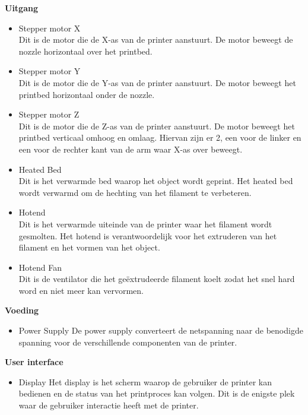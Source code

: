 \documentclass{article}
\begin{document}
\textbf{Uitgang}
\begin{itemize}
  \item Stepper motor X\\
  Dit is de motor die de X-as van de printer aanstuurt. De motor beweegt de nozzle horizontaal over het printbed.
  \item Stepper motor Y\\
  Dit is de motor die de Y-as van de printer aanstuurt. De motor beweegt het printbed horizontaal onder de nozzle.
  \item Stepper motor Z\\
  Dit is de motor die de Z-as van de printer aanstuurt. De motor beweegt het printbed verticaal omhoog en omlaag. Hiervan zijn er 2, een voor de linker en een voor de rechter kant van de arm waar X-as over beweegt.
  \item Heated Bed\\
  Dit is het verwarmde bed waarop het object wordt geprint. Het heated bed wordt verwarmd om de hechting van het filament te verbeteren.
  \item Hotend\\
  Dit is het verwarmde uiteinde van de printer waar het filament wordt gesmolten. Het hotend is verantwoordelijk voor het extruderen van het filament en het vormen van het object.
  \item Hotend Fan\\
  Dit is de ventilator die het geëxtrudeerde filament koelt zodat het snel hard word en niet meer kan vervormen.
\end{itemize}

\textbf{Voeding}
\begin{itemize}
  \item Power Supply
  De power supply converteert de netspanning naar de benodigde spanning voor de verschillende componenten van de printer.
\end{itemize}

\textbf{User interface}
\begin{itemize}
  \item Display
  Het display is het scherm waarop de gebruiker de printer kan bedienen en de status van het printproces kan volgen. Dit is de enigste plek waar de gebruiker interactie heeft met de printer.
\end{itemize}
\end{document}
